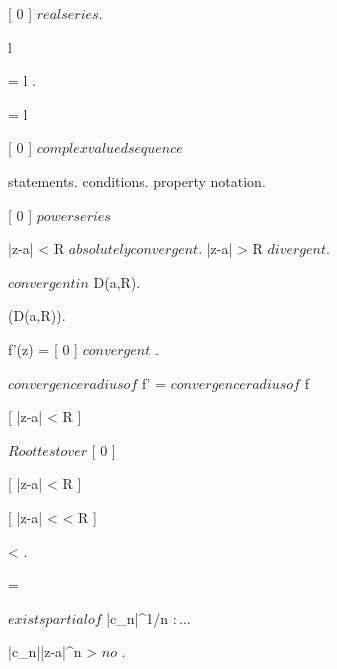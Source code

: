 \documentclass[../Main/main]{subfiles}
\begin{document}
{	
	{
		{
			[ 0 ] $ real series $.

			l \in \R \suchthat 
		}
		\holds
		{
			{
				 = l
			}.

			 = l
		}
	}
	
	
	{
		{
			[ 0 ] $ complex valued sequence $
		}
		{
			{
			}
		}
	}
	
	
	{
		{
			statements.
		}
		{
			conditions.
		}
		\denote
		{
			property \as notation.
		}
	}
	
	
	
	{
		{
			[ 0 ] $ power series $
		}
		\holds
		{
			|z-a| < R \imp $ absolutely convergent $.
			|z-a| > R \imp $ divergent $.

			$ convergent in $ D(a,R).

			 \in \Hc(D(a,R)).

			{
				f'(z) = [ 0 ] $ convergent $ 
			}.

			$ convergence radius of $ f' = $ convergence radius of $ f
		}
		\demonstration
		{
			 [ |z-a| < R ]
			 {
			 	$ Root test over $ [ 0 ]


			 [ |z-a| < R ]
			 {
			 	\all{ \rho \in \R }[ |z-a| < \rho < R ]
			 	{
			 		 < .

			 		 =  \imp

			 		$ exists partial of $ |c_n|^{1/n} $:..$.

			 		|c_n||z-a|^n >  $ no $ .

}}}}}}
\end{document}
